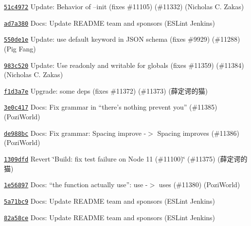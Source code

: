 \begin{DoxyItemize}
\item \href{https://github.com/eslint/eslint/commit/51c497298a15ad296a2b1f8fc397df687976b836}{\texttt{ {\ttfamily 51c4972}}} Update\+: Behavior of --init (fixes \#11105) (\#11332) (Nicholas C. Zakas)
\item \href{https://github.com/eslint/eslint/commit/ad7a38097c32a91e5a831ef1bc8933601532576c}{\texttt{ {\ttfamily ad7a380}}} Docs\+: Update R\+E\+A\+D\+ME team and sponsors (E\+S\+Lint Jenkins)
\item \href{https://github.com/eslint/eslint/commit/550de1e611a1e9af873bcb18d74cf2056e8d2e1b}{\texttt{ {\ttfamily 550de1e}}} Update\+: use {\ttfamily default} keyword in J\+S\+ON schema (fixes \#9929) (\#11288) (Pig Fang)
\item \href{https://github.com/eslint/eslint/commit/983c5201210d7a4ffab0b3d05ab9919c0754e5ca}{\texttt{ {\ttfamily 983c520}}} Update\+: Use \textquotesingle{}readonly\textquotesingle{} and \textquotesingle{}writable\textquotesingle{} for globals (fixes \#11359) (\#11384) (Nicholas C. Zakas)
\item \href{https://github.com/eslint/eslint/commit/f1d3a7ee7c82365989e219b1dae379f08f6dd526}{\texttt{ {\ttfamily f1d3a7e}}} Upgrade\+: some deps (fixes \#11372) (\#11373) (薛定谔的猫)
\item \href{https://github.com/eslint/eslint/commit/3e0c4176eff085498b813f8ba1732d7ed6ee44f8}{\texttt{ {\ttfamily 3e0c417}}} Docs\+: Fix grammar in “there’s nothing prevent you” (\#11385) (Pozi\+World)
\item \href{https://github.com/eslint/eslint/commit/de988bc909b491366ad0cd9bc83f4d6de42d041a}{\texttt{ {\ttfamily de988bc}}} Docs\+: Fix grammar\+: Spacing improve -\/$>$ Spacing improves (\#11386) (Pozi\+World)
\item \href{https://github.com/eslint/eslint/commit/1309dfdebb5595460b79dcac20df6a1f109e7566}{\texttt{ {\ttfamily 1309dfd}}} Revert \char`\"{}\+Build\+: fix test failure on Node 11 (\#11100)\char`\"{} (\#11375) (薛定谔的猫)
\item \href{https://github.com/eslint/eslint/commit/1e56897db3e254e0aef6d2fe3274157fc379c79e}{\texttt{ {\ttfamily 1e56897}}} Docs\+: “the function actually use”\+: use -\/$>$ uses (\#11380) (Pozi\+World)
\item \href{https://github.com/eslint/eslint/commit/5a71bc95a7e961b1b1b77022645e0bd9cdd08dc0}{\texttt{ {\ttfamily 5a71bc9}}} Docs\+: Update R\+E\+A\+D\+ME team and sponsors (E\+S\+Lint Jenkins)
\item \href{https://github.com/eslint/eslint/commit/82a58ce26b282fd80335b3ac4fc88f21266c3ba1}{\texttt{ {\ttfamily 82a58ce}}} Docs\+: Update R\+E\+A\+D\+ME team and sponsors (E\+S\+Lint Jenkins)

\end{DoxyItemize}
